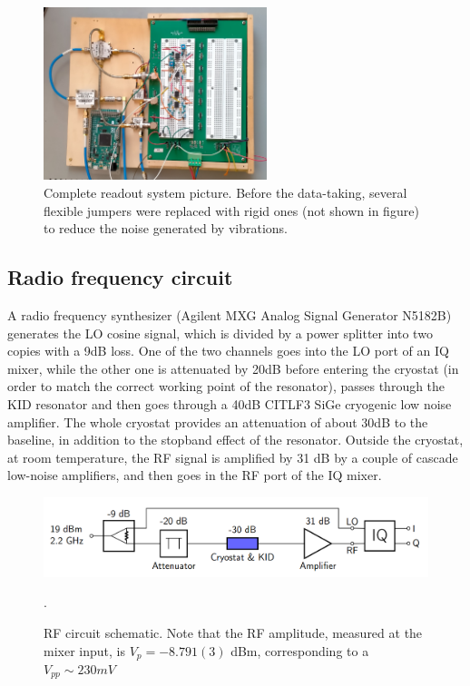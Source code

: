 \documentclass[12pt]{article}
\begin{document}
\begin{figure}[H]
\centering
\includegraphics[width=0.58\textwidth]{circuitocompleto.jpg}
\caption{Complete readout system picture. Before the data-taking, several flexible jumpers were replaced with rigid ones (not shown in figure) to reduce the noise generated by vibrations.}
\end{figure}
\subsection{Radio frequency circuit}
A radio frequency synthesizer (Agilent MXG Analog Signal Generator N5182B) generates the LO cosine signal, which is divided by a power splitter into two copies with a 9dB loss. One of the two channels goes into the LO port of an IQ mixer, while the other one is attenuated by 20dB before entering the cryostat (in order to match the correct working point of the resonator), passes through the KID resonator and then goes through a 40dB CITLF3 SiGe cryogenic low noise amplifier.
The whole cryostat provides an attenuation of about 30dB to the baseline, in addition to the stopband effect of the resonator.
Outside the cryostat, at room temperature, the RF signal is amplified by 31 dB by a couple of cascade low-noise amplifiers, and then goes in the RF port of the IQ mixer.
\begin{figure}[H]
        \centering
        \includegraphics[width=\textwidth]{RFcircuito.PNG}
        \footnotesize{\caption{RF circuit schematic. Note that the RF amplitude, measured at the mixer input, is $V_p = -8.791(3)$ dBm, corresponding to a $V_{pp} \sim 230 mV$}.}
        \label{RFcircuit}
    \end{figure}
\end{document}
